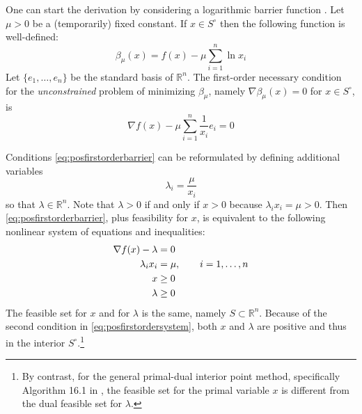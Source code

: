 \documentclass[11pt]{article}
\newcommand{\RR}{\mathbb{R}}
\newcommand{\grad}{\nabla}
\begin{document}
One can start the derivation by considering a logarithmic barrier function \cite[section 16.2]{GrivaNashSofer2009}.  Let $\mu>0$ be a (temporarily) fixed constant.  If $x\in S^\circ$ then the following function is well-defined:
\begin{equation}
\beta_\mu(x) = f(x) - \mu \sum_{i=1}^n \ln x_i \label{eq:posbarrierfunction}
\end{equation}
Let $\{e_1,\dots,e_n\}$ be the standard basis of $\RR^n$.  The first-order necessary condition for the \emph{unconstrained} problem of minimizing $\beta_\mu$, namely $\grad \beta_\mu(x)=0$ for $x \in S^\circ$, is
\begin{equation}
\grad f(x) - \mu \sum_{i=1}^n \frac{1}{x_i} e_i = 0 \label{eq:posfirstorderbarrier}
\end{equation}

Conditions \eqref{eq:posfirstorderbarrier} can be reformulated by defining additional variables
    $$\lambda_i = \frac{\mu}{x_i}$$
so that $\lambda\in\RR^n$.  Note that $\lambda>0$ if and only if $x>0$ because $\lambda_i x_i = \mu > 0$.  Then \eqref{eq:posfirstorderbarrier}, plus feasibility for $x$, is equivalent to the following nonlinear system of equations and inequalities:
\begin{align}
\grad f(x) - \lambda &= 0 \label{eq:posfirstordersystem} \\
\lambda_i x_i &= \mu, \qquad i=1,\dots,n \notag \\
x &\ge 0 \notag \\
\lambda &\ge 0 \notag
\end{align}
The feasible set for $x$ and for $\lambda$ is the same, namely $S \subset \RR^n$.  Because of the second condition in \eqref{eq:posfirstordersystem}, both $x$ and $\lambda$ are positive and thus in the interior $S^\circ$.\footnote{By contrast, for the general primal-dual interior point method, specifically Algorithm 16.1 in \cite[section 16.7]{GrivaNashSofer2009}, the feasible set for the primal variable $x$ is different from the dual feasible set for $\lambda$.}
\end{document}

